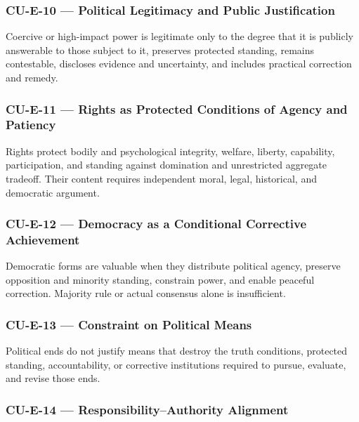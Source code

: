 \documentclass[
  11pt,
]{article}
\begin{document}
\subsubsection{CU-E-10 --- Political Legitimacy and Public
Justification}\label{cu-e-10-political-legitimacy-and-public-justification-1}

Coercive or high-impact power is legitimate only to the degree that it
is publicly answerable to those subject to it, preserves protected
standing, remains contestable, discloses evidence and uncertainty, and
includes practical correction and remedy.

\subsubsection{CU-E-11 --- Rights as Protected Conditions of Agency and
Patiency}\label{cu-e-11-rights-as-protected-conditions-of-agency-and-patiency-1}

Rights protect bodily and psychological integrity, welfare, liberty,
capability, participation, and standing against domination and
unrestricted aggregate tradeoff. Their content requires independent
moral, legal, historical, and democratic argument.

\subsubsection{CU-E-12 --- Democracy as a Conditional Corrective
Achievement}\label{cu-e-12-democracy-as-a-conditional-corrective-achievement-1}

Democratic forms are valuable when they distribute political agency,
preserve opposition and minority standing, constrain power, and enable
peaceful correction. Majority rule or actual consensus alone is
insufficient.

\subsubsection{CU-E-13 --- Constraint on Political
Means}\label{cu-e-13-constraint-on-political-means-1}

Political ends do not justify means that destroy the truth conditions,
protected standing, accountability, or corrective institutions required
to pursue, evaluate, and revise those ends.

\subsubsection{CU-E-14 --- Responsibility--Authority
Alignment}\label{cu-e-14-responsibilityauthority-alignment-1}
\end{document}
